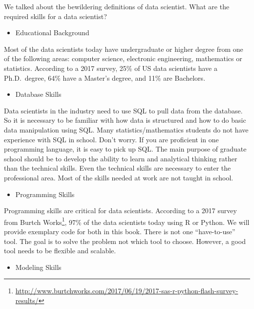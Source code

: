 \documentclass[12pt,]{krantz}
\providecommand{\tightlist}{%
  \setlength{\itemsep}{0pt}\setlength{\parskip}{0pt}}
\renewcommand{\href}[2]{#2\footnote{\url{#1}}}
\theoremstyle{definition}
\theoremstyle{definition}
\theoremstyle{definition}
\theoremstyle{remark}
\begin{document}
We talked about the bewildering definitions of data scientist. What are
the required skills for a data scientist?

\begin{itemize}
\tightlist
\item
  Educational Background
\end{itemize}

Most of the data scientists today have undergraduate or higher degree
from one of the following areas: computer science, electronic
engineering, mathematics or statistics. According to a 2017 survey, 25\%
of US data scientists have a Ph.D.~degree, 64\% have a Master's degree,
and 11\% are Bachelors.

\begin{itemize}
\tightlist
\item
  Database Skills
\end{itemize}

Data scientists in the industry need to use SQL to pull data from the
database. So it is necessary to be familiar with how data is structured
and how to do basic data manipulation using SQL. Many
statistics/mathematics students do not have experience with SQL in
school. Don't worry. If you are proficient in one programming language,
it is easy to pick up SQL. The main purpose of graduate school should be
to develop the ability to learn and analytical thinking rather than the
technical skills. Even the technical skills are necessary to enter the
professional area. Most of the skills needed at work are not taught in
school.

\begin{itemize}
\tightlist
\item
  Programming Skills
\end{itemize}

Programming skills are critical for data scientists. According to a 2017
survey from
\href{http://www.burtchworks.com/2017/06/19/2017-sas-r-python-flash-survey-results/}{Burtch
Works}, 97\% of the data scientists today using R or Python. We will
provide exemplary code for both in this book. There is not one
``have-to-use'' tool. The goal is to solve the problem not which tool to
choose. However, a good tool needs to be flexible and scalable.

\begin{itemize}
\tightlist
\item
  Modeling Skills
\end{itemize}
\end{document}
